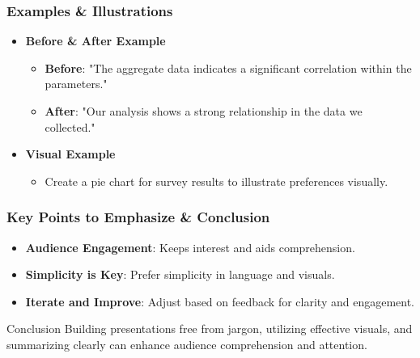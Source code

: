 \documentclass[aspectratio=169]{beamer}
\begin{document}
\begin{frame}[fragile]
    \frametitle{Examples \& Illustrations}
    \begin{itemize}
        \item \textbf{Before \& After Example}
            \begin{itemize}
                \item \textbf{Before}: "The aggregate data indicates a significant correlation within the parameters."
                \item \textbf{After}: "Our analysis shows a strong relationship in the data we collected."
            \end{itemize}
        \item \textbf{Visual Example}
            \begin{itemize}
                \item Create a pie chart for survey results to illustrate preferences visually.
            \end{itemize}
    \end{itemize}
\end{frame}

\begin{frame}[fragile]
    \frametitle{Key Points to Emphasize \& Conclusion}
    \begin{itemize}
        \item \textbf{Audience Engagement}: Keeps interest and aids comprehension.
        \item \textbf{Simplicity is Key}: Prefer simplicity in language and visuals.
        \item \textbf{Iterate and Improve}: Adjust based on feedback for clarity and engagement.
    \end{itemize}
    \begin{block}{Conclusion}
        Building presentations free from jargon, utilizing effective visuals, and summarizing clearly can enhance audience comprehension and attention.
    \end{block}
\end{frame}
\end{document}

